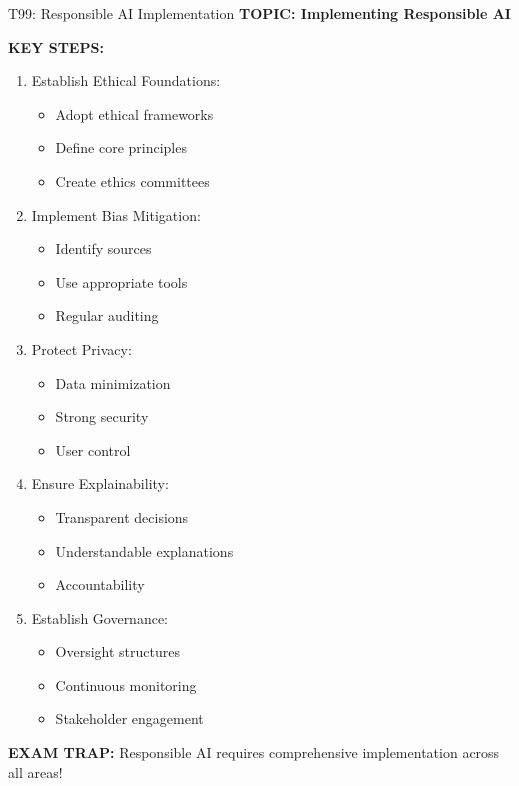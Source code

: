 \documentclass[8pt]{beamer}
\begin{document}
	\begin{frame}{T99: Responsible AI Implementation}
		\fontsize{6.5}{7.5}\selectfont
		\textbf{TOPIC: Implementing Responsible AI}
		
		\vspace{0.1cm}
		\textbf{KEY STEPS:}
		\begin{enumerate}
			\item \textcolor{myblue}{Establish Ethical Foundations:}
			\begin{itemize}
				\item Adopt ethical frameworks
				\item Define core principles
				\item Create ethics committees
			\end{itemize}
			\item \textcolor{myblue}{Implement Bias Mitigation:}
			\begin{itemize}
				\item Identify sources
				\item Use appropriate tools
				\item Regular auditing
			\end{itemize}
			\item \textcolor{myblue}{Protect Privacy:}
			\begin{itemize}
				\item Data minimization
				\item Strong security
				\item User control
			\end{itemize}
			\item \textcolor{myblue}{Ensure Explainability:}
			\begin{itemize}
				\item Transparent decisions
				\item Understandable explanations
				\item Accountability
			\end{itemize}
			\item \textcolor{myblue}{Establish Governance:}
			\begin{itemize}
				\item Oversight structures
				\item Continuous monitoring
				\item Stakeholder engagement
			\end{itemize}
		\end{enumerate}
		
		\textcolor{myred}{\textbf{EXAM TRAP:}} Responsible AI requires \textcolor{myblue}{comprehensive implementation} across all areas!
	\end{frame}
	
\end{document}

